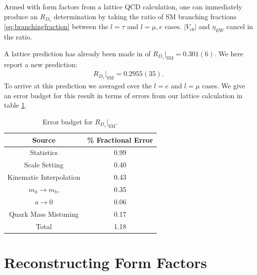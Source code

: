 Armed with form factors from a lattice QCD calculation, one can immediately produce an $R_{D_s}$ determination by taking the ratio of SM branching fractions \eqref{eq:branchingfraction} between the $l=\tau$ and $l=\mu,e$ cases. $|V_{cb}|$ and $\eta_{EW}$ cancel in the ratio.

A lattice prediction has already been made in \cite{Monahan:2017uby} of $R_{D_s}|_{\text{SM}} = 0.301(6)$. We here report a new prediction:
\begin{align}
  R_{D_s}|_{\text{SM}} = 0.2955(35).
  \label{eq:RDs}
\end{align}
To arrive at this prediction we averaged over the $l=e$ and $l=\mu$ cases. We give an error budget for this result in terms of errors from our lattice calculation in table \ref{RDs_budget}.

\begin{table}[htb!]
  \begin{center}
    \begin{tabular}{c c}
      \hline
      Source & \% Fractional Error \\ [0.5ex]
      \hline
      Statistics & 0.99  \\ [1ex]
      Scale Setting & 0.40  \\ [1ex]
      Kinematic Interpolation & 0.43  \\ [1ex]
      $m_h \to m_b$, & 0.35  \\ [1ex]
      $a\to 0$ & 0.06  \\ [1ex]
      Quark Mass Mistuning & 0.17 \\ [1ex]
      \hline
      Total & 1.18 \\ [1ex]
      \hline
    \end{tabular}
  \end{center}
  \caption{Error budget for $R_{D_s}|_{\text{SM}}$.\label{RDs_budget}}
\end{table}

\section{Reconstructing Form Factors}
\label{sec:reconstructing_formfactors}

